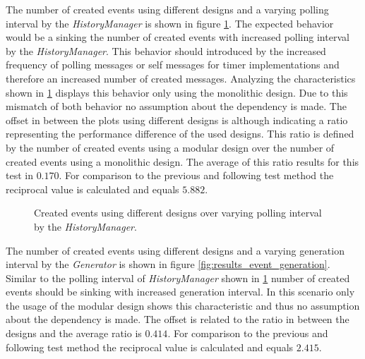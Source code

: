 The number of created events using different designs and a varying polling interval by the \emph{HistoryManager} is shown in figure \ref{fig:results_event_polling}.
The expected behavior would be a sinking the number of created events with increased polling interval by the \emph{HistoryManager}.
This behavior should introduced by the increased frequency of polling messages or self messages for timer implementations and therefore an increased number of created messages.
Analyzing the characteristics shown in \ref{fig:results_event_polling} displays this behavior only using the monolithic design.
Due to this mismatch of both behavior no assumption about the dependency is made.
The offset in between the plots using different designs is although indicating a ratio representing the performance difference of the used designs.
This ratio is defined by the number of created events using a modular design over the number of created events using a monolithic design.
The average of this ratio results for this test in $0.170$.
For comparison to the previous and following test method the reciprocal value is calculated and equals $5.882$.
\\

\begin{figure}
    \centering
    \caption{Created events using different designs over varying polling interval by the \emph{HistoryManager}.}
    \label{fig:results_event_polling}
\end{figure}

The number of created events using different designs and a varying generation interval by the \emph{Generator} is shown in figure \ref{fig:results_event_generation}.
Similar to the polling interval of \emph{HistoryManager} shown in \ref{fig:results_event_polling} number of created events should be sinking with increased generation interval.
In this scenario only the usage of the modular design shows this characteristic and thus no assumption about the dependency is made.
The offset is related to the ratio in between the designs and the average ratio is $0.414$.
For comparison to the previous and following test method the reciprocal value is calculated and equals $2.415$.
\\

